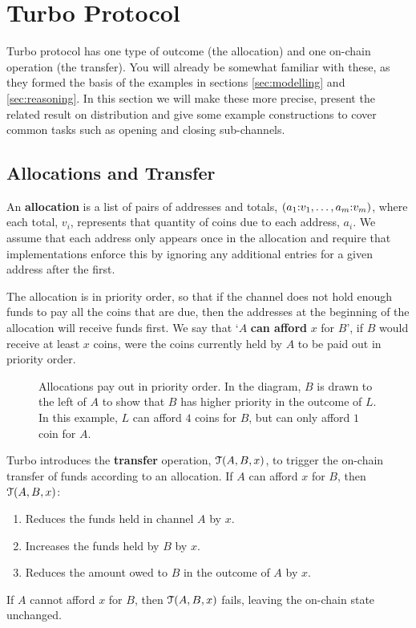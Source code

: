 \section{Turbo Protocol}

Turbo protocol has one type of outcome (the allocation) and one on-chain operation (the transfer).
You will already be somewhat familiar with these, as they formed the basis of the examples in sections \ref{sec:modelling} and \ref{sec:reasoning}.
In this section we will make these more precise, present the related result on distribution and give some example constructions to cover common tasks such as opening and closing sub-channels.

\subsection{Allocations and Transfer}

An \textbf{allocation} is a list of pairs of addresses and totals, $( a_1{:}v_1, \dots, a_m{:}v_m )$, where each total, $v_i$, represents that quantity of coins due to each address, $a_i$.
We assume that each address only appears once in the allocation and require that implementations enforce this by ignoring any additional entries for a given address after the first.

The allocation is in priority order, so that if the channel does not hold enough funds to pay all the coins that are due, then the addresses at the beginning of the allocation will receive funds first.
We say that `$A$ \textbf{can afford} $x$ for $B$', if $B$ would receive at least $x$ coins, were the coins currently held by $A$ to be paid out in priority order.

\begin{figure}[h]\centering
  \makebox[\textwidth][c]{}
  \caption{
    Allocations pay out in priority order.
    In the diagram, $B$ is drawn to the left of $A$ to show that $B$ has higher priority in the outcome of $L$.
    In this example, $L$ can afford $4$ coins for $B$, but can only afford $1$ coin for $A$.
  }\label{fig:transfer-insufficient-funds}
\end{figure}

Turbo introduces the \textbf{transfer} operation, $\mathcal{T}(A, B, x)$, to trigger the on-chain transfer of funds according to an allocation.
If $A$ can afford $x$ for $B$, then $\mathcal{T}(A, B, x)$:
\begin{enumerate}
  \item Reduces the funds held in channel $A$ by $x$. 
  \item Increases the funds held by $B$ by $x$.
  \item Reduces the amount owed to $B$ in the outcome of $A$ by $x$.
\end{enumerate}
If $A$ cannot afford $x$ for $B$, then $\mathcal{T}(A, B, x)$ fails, leaving the on-chain state unchanged.

